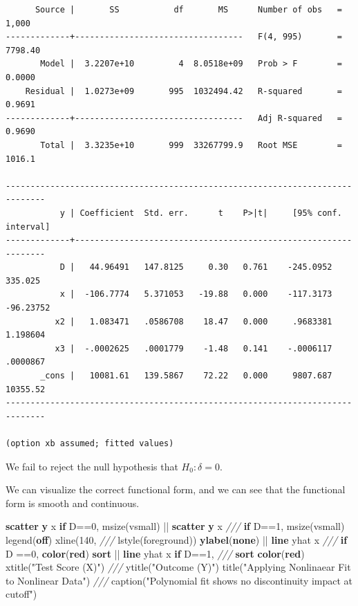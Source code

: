 \documentclass[
]{book}
\newenvironment{Shaded}{\begin{snugshade}}{\end{snugshade}}
\newcommand{\BaseNTok}[1]{\textcolor[rgb]{0.00,0.00,0.81}{#1}}
\newcommand{\CommentTok}[1]{\textcolor[rgb]{0.56,0.35,0.01}{\textit{#1}}}
\newcommand{\FunctionTok}[1]{\textcolor[rgb]{0.13,0.29,0.53}{\textbf{#1}}}
\newcommand{\KeywordTok}[1]{\textcolor[rgb]{0.13,0.29,0.53}{\textbf{#1}}}
\newcommand{\NormalTok}[1]{#1}
\newcommand{\StringTok}[1]{\textcolor[rgb]{0.31,0.60,0.02}{#1}}
\begin{document}
\begin{verbatim}
      Source |       SS           df       MS      Number of obs   =     1,000
-------------+----------------------------------   F(4, 995)       =   7798.40
       Model |  3.2207e+10         4  8.0518e+09   Prob > F        =    0.0000
    Residual |  1.0273e+09       995  1032494.42   R-squared       =    0.9691
-------------+----------------------------------   Adj R-squared   =    0.9690
       Total |  3.3235e+10       999  33267799.9   Root MSE        =    1016.1

------------------------------------------------------------------------------
           y | Coefficient  Std. err.      t    P>|t|     [95% conf. interval]
-------------+----------------------------------------------------------------
           D |   44.96491   147.8125     0.30   0.761    -245.0952     335.025
           x |  -106.7774   5.371053   -19.88   0.000    -117.3173   -96.23752
          x2 |   1.083471   .0586708    18.47   0.000     .9683381    1.198604
          x3 |  -.0002625   .0001779    -1.48   0.141    -.0006117    .0000867
       _cons |   10081.61   139.5867    72.22   0.000     9807.687    10355.52
------------------------------------------------------------------------------

(option xb assumed; fitted values)
\end{verbatim}

We fail to reject the null hypothesis that \(H_0: \delta = 0\).

We can visualize the correct functional form, and we can see that the functional form is smooth and continuous.

\begin{Shaded}
\begin{Highlighting}[]
\KeywordTok{scatter} \FunctionTok{y}\NormalTok{ x }\KeywordTok{if}\NormalTok{ D==0, msize(vsmall) || }\KeywordTok{scatter} \FunctionTok{y}\NormalTok{ x }\CommentTok{///}
  \KeywordTok{if}\NormalTok{ D==1, msize(vsmall) }\BaseNTok{legend}\NormalTok{(}\KeywordTok{off}\NormalTok{) }\BaseNTok{xline}\NormalTok{(140, }\CommentTok{///}
\NormalTok{  lstyle(}\BaseNTok{foreground}\NormalTok{)) }\KeywordTok{ylabel}\NormalTok{(}\KeywordTok{none}\NormalTok{) || }\KeywordTok{line}\NormalTok{ yhat x }\CommentTok{///}
  \KeywordTok{if}\NormalTok{ D ==0, }\KeywordTok{color}\NormalTok{(}\KeywordTok{red}\NormalTok{) }\KeywordTok{sort}\NormalTok{ || }\KeywordTok{line}\NormalTok{ yhat x }\KeywordTok{if}\NormalTok{ D==1, }\CommentTok{///}
  \KeywordTok{sort} \KeywordTok{color}\NormalTok{(}\KeywordTok{red}\NormalTok{) }\BaseNTok{xtitle}\NormalTok{(}\StringTok{"Test Score (X)"}\NormalTok{) }\CommentTok{///}
  \BaseNTok{ytitle}\NormalTok{(}\StringTok{"Outcome (Y)"}\NormalTok{) }\BaseNTok{title}\NormalTok{(}\StringTok{"Applying Nonlinaear Fit to Nonlinear Data"}\NormalTok{) }\CommentTok{///}
  \BaseNTok{caption}\NormalTok{(}\StringTok{"Polynomial fit shows no discontinuity impact at cutoff"}\NormalTok{)}
\end{Highlighting}
\end{Shaded}
\end{document}
